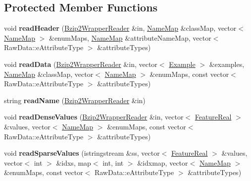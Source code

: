 \subsection*{Protected Member Functions}
\begin{DoxyCompactItemize}
\item 
\hypertarget{classMultiBoost_1_1ArffParserBzip2_a7450f18d2c01e44a620337ccfe8cd3f7}{void {\bfseries read\-Header} (\hyperlink{classBzip2WrapperReader}{Bzip2\-Wrapper\-Reader} \&in, \hyperlink{classMultiBoost_1_1NameMap}{Name\-Map} \&class\-Map, vector$<$ \hyperlink{classMultiBoost_1_1NameMap}{Name\-Map} $>$ \&enum\-Maps, \hyperlink{classMultiBoost_1_1NameMap}{Name\-Map} \&attribute\-Name\-Map, vector$<$ Raw\-Data\-::e\-Attribute\-Type $>$ \&attribute\-Types)}\label{classMultiBoost_1_1ArffParserBzip2_a7450f18d2c01e44a620337ccfe8cd3f7}

\item 
\hypertarget{classMultiBoost_1_1ArffParserBzip2_a9b07cbc108356f6cf91643814fcd1c62}{void {\bfseries read\-Data} (\hyperlink{classBzip2WrapperReader}{Bzip2\-Wrapper\-Reader} \&in, vector$<$ \hyperlink{classMultiBoost_1_1Example}{Example} $>$ \&examples, \hyperlink{classMultiBoost_1_1NameMap}{Name\-Map} \&class\-Map, vector$<$ \hyperlink{classMultiBoost_1_1NameMap}{Name\-Map} $>$ \&enum\-Maps, const vector$<$ Raw\-Data\-::e\-Attribute\-Type $>$ \&attribute\-Types)}\label{classMultiBoost_1_1ArffParserBzip2_a9b07cbc108356f6cf91643814fcd1c62}

\item 
\hypertarget{classMultiBoost_1_1ArffParserBzip2_afed899802752f9026d1a4305e98dfed3}{string {\bfseries read\-Name} (\hyperlink{classBzip2WrapperReader}{Bzip2\-Wrapper\-Reader} \&in)}\label{classMultiBoost_1_1ArffParserBzip2_afed899802752f9026d1a4305e98dfed3}

\item 
\hypertarget{classMultiBoost_1_1ArffParserBzip2_a92958d5450b143a8b6750c016591d79b}{void {\bfseries read\-Dense\-Values} (\hyperlink{classBzip2WrapperReader}{Bzip2\-Wrapper\-Reader} \&in, vector$<$ \hyperlink{Defaults_8h_a3a11cfe6a5d469d921716ca6291e934f}{Feature\-Real} $>$ \&values, vector$<$ \hyperlink{classMultiBoost_1_1NameMap}{Name\-Map} $>$ \&enum\-Maps, const vector$<$ Raw\-Data\-::e\-Attribute\-Type $>$ \&attribute\-Types)}\label{classMultiBoost_1_1ArffParserBzip2_a92958d5450b143a8b6750c016591d79b}

\item 
\hypertarget{classMultiBoost_1_1ArffParserBzip2_af68e0ae9d5407a44de71f9393365d34d}{void {\bfseries read\-Sparse\-Values} (istringstream \&ss, vector$<$ \hyperlink{Defaults_8h_a3a11cfe6a5d469d921716ca6291e934f}{Feature\-Real} $>$ \&values, vector$<$ int $>$ \&idxs, map$<$ int, int $>$ \&idxmap, vector$<$ \hyperlink{classMultiBoost_1_1NameMap}{Name\-Map} $>$ \&enum\-Maps, const vector$<$ Raw\-Data\-::e\-Attribute\-Type $>$ \&attribute\-Types)}\label{classMultiBoost_1_1ArffParserBzip2_af68e0ae9d5407a44de71f9393365d34d}


\end{DoxyCompactItemize}
